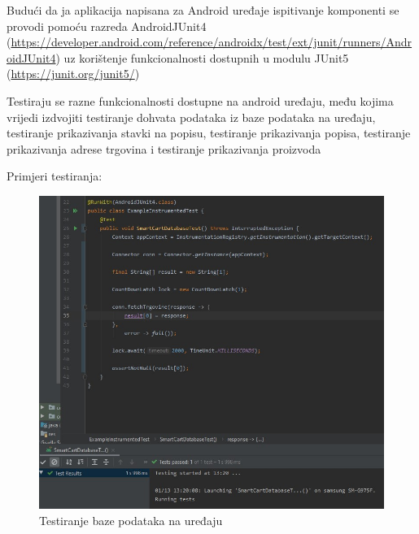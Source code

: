 			Budući da ja aplikacija napisana za Android uređaje ispitivanje komponenti
			se provodi pomoću razreda AndroidJUnit4 (\url{https://developer.android.com/reference/androidx/test/ext/junit/runners/AndroidJUnit4})
			uz korištenje funkcionalnosti dostupnih u modulu JUnit5 (\url{https://junit.org/junit5/})
			
			Testiraju se razne funkcionalnosti dostupne na android uređaju, među kojima
			vrijedi izdvojiti testiranje dohvata podataka iz baze podataka na uređaju, testiranje prikazivanja
			stavki na popisu, testiranje prikazivanja popisa, testiranje prikazivanja adrese trgovina i testiranje
			prikazivanja proizvoda
			
			Primjeri testiranja:
			
			\begin{figure}[H]
				\centering
				\includegraphics[scale=0.7]{slike/androidTest1.jpg}
				\caption{Testiranje baze podataka na uređaju}
				\label{fig:test_uredaj_db}
			\end{figure}
		
